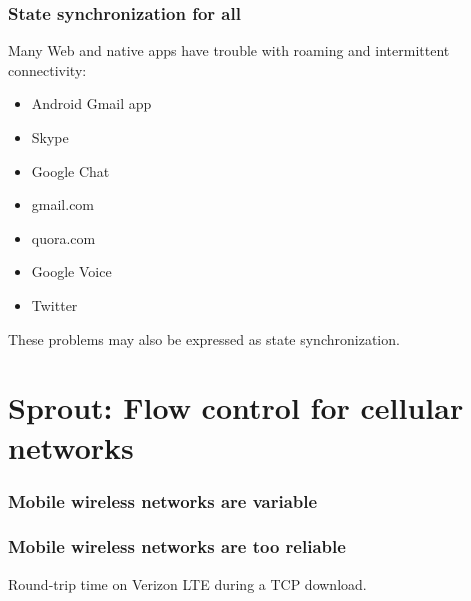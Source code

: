 \documentclass[svgnames]{beamer}
\begin{document}
\begin{frame}
\frametitle{State synchronization for all}

Many Web and native apps have trouble with roaming and intermittent connectivity:

\begin{itemize}
\item Android Gmail app
\item Skype
\item Google Chat
\item gmail.com
\item quora.com
\item Google Voice
\item Twitter
\end{itemize}

These problems may also be expressed as state synchronization.

\end{frame}

\section{Sprout: Flow control for cellular networks}

\begin{frame}
\tableofcontents[currentsection]
\end{frame}

\begin{frame}
\frametitle{Mobile wireless networks are variable}

{\small
\def\svgwidth{\columnwidth}
}

\end{frame}

\begin{frame}
\frametitle{Mobile wireless networks are too reliable}


{\small
\def\svgwidth{2.8 in}

Round-trip time on Verizon LTE during a TCP download.
}

\end{frame}
\end{document}
